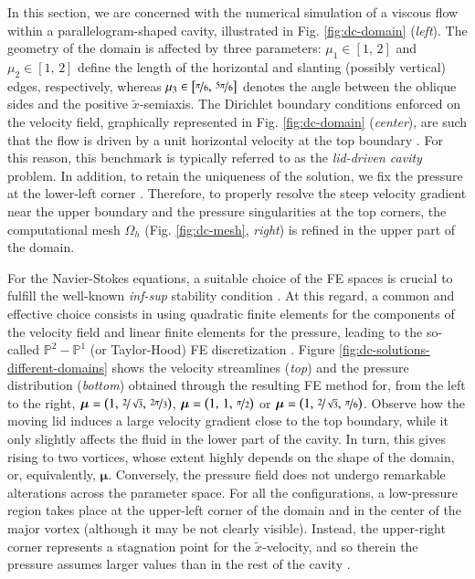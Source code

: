\documentclass{elsarticle}
\numberwithin{equation}{section}
\theoremstyle{theorem}
\theoremstyle{definition}
\theoremstyle{remark}
\theoremstyle{proposition}
\numberwithin{figure}{section}
\newcommand{\wt}[1]{\widetilde{#1}}
\newcommand{\bg}[1]{\boldsymbol{#1}}
\begin{document}
		In this section, we are concerned with the numerical simulation of a viscous flow within a parallelogram-shaped cavity, illustrated in Fig. \ref{fig:dc-domain} (\emph{left}). The geometry of the domain is affected by three parameters: $\mu_1 \in [1, \, 2]$ and $\mu_2 \in [1, \, 2]$ define the length of the horizontal and slanting (possibly vertical) edges, respectively, whereas $\mu_3 \in \big[ \nicefrac{\pi}{6}, \, \nicefrac{5 \pi}{6} \big]$ denotes the angle between the oblique sides and the positive $\wt{x}$-semiaxis. The Dirichlet boundary conditions enforced on the velocity field, graphically represented in Fig. \ref{fig:dc-domain} (\emph{center}), are such that the flow is driven by a unit horizontal velocity at the top boundary \cite{Per02}. For this reason, this benchmark is typically referred to as the \emph{lid-driven cavity} problem. In addition, to retain the uniqueness of the solution, we fix the pressure at the lower-left corner \cite{Dho14}. Therefore, to properly resolve the steep velocity gradient near the upper boundary and the pressure singularities at the top corners, the computational mesh $\Omega_h$ (Fig. \ref{fig:dc-mesh}, \emph{right}) is refined in the upper part of the domain. %
		
		For the Navier-Stokes equations, a suitable choice of the FE spaces is crucial to fulfill the well-known \emph{inf-sup} stability condition \cite{Ran99}. At this regard, a common and effective choice consists in using quadratic finite elements for the components of the velocity field and linear finite elements for the pressure, leading to the so-called $\mathbb{P}^2 - \mathbb{P}^1$ (or Taylor-Hood) FE discretization \cite{Per02}. Figure \ref{fig:dc-solutions-different-domains} shows the velocity streamlines (\emph{top}) and the pressure distribution (\emph{bottom}) obtained through the resulting FE method for, from the left to the right, $\bg{\mu} = \big( 1, \, \nicefrac{2}{\sqrt{3}}, \, \nicefrac{2 \pi}{3} \big)$, $\bg{\mu} = \big( 1, \, 1, \, \nicefrac{\pi}{2} \big)$ or $\bg{\mu} = \big( 1, \, \nicefrac{2}{\sqrt{3}}, \, \nicefrac{\pi}{6} \big)$. Observe how the moving lid induces a large velocity gradient close to the top boundary, while it only slightly affects the fluid in the lower part of the cavity. In turn, this gives rising to two vortices, whose extent highly depends on the shape of the domain, or, equivalently, $\bg{\mu}$. Conversely, the pressure field does not undergo remarkable alterations across the parameter space. For all the configurations, a low-pressure region takes place at the upper-left corner of the domain and in the center of the major vortex (although it may be not clearly visible). Instead, the upper-right corner represents a stagnation point for the $\wt{x}$-velocity, and so therein the pressure assumes larger values than in the rest of the cavity \cite{Dho14}.
		
\end{document}
